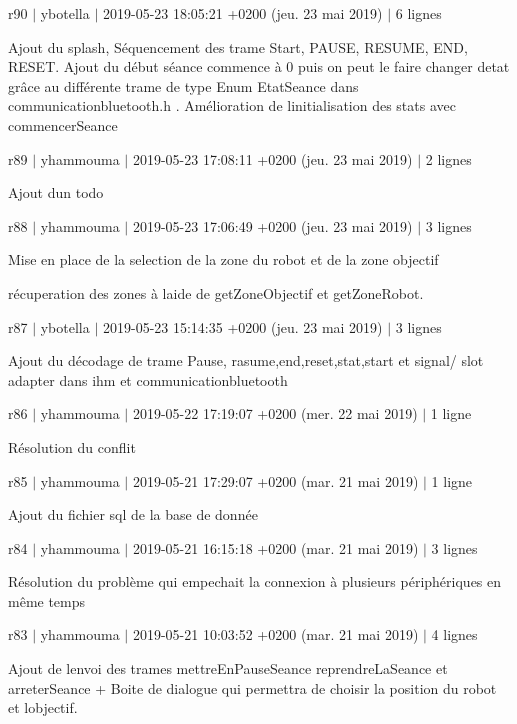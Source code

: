 r90 $\vert$ ybotella $\vert$ 2019-\/05-\/23 18\+:05\+:21 +0200 (jeu. 23 mai 2019) $\vert$ 6 lignes

Ajout du splash, Séquencement des trame Start, P\+A\+U\+SE, R\+E\+S\+U\+ME, E\+ND, R\+E\+S\+ET. Ajout du début séance commence à 0 puis on peut le faire changer d\textquotesingle{}etat grâce au différente trame de type Enum Etat\+Seance dans communicationbluetooth.\+h . Amélioration de l\textquotesingle{}initialisation des stats avec commencer\+Seance

r89 $\vert$ yhammouma $\vert$ 2019-\/05-\/23 17\+:08\+:11 +0200 (jeu. 23 mai 2019) $\vert$ 2 lignes

Ajout d\textquotesingle{}un todo

r88 $\vert$ yhammouma $\vert$ 2019-\/05-\/23 17\+:06\+:49 +0200 (jeu. 23 mai 2019) $\vert$ 3 lignes

Mise en place de la selection de la zone du robot et de la zone objectif
\begin{DoxyItemize}
\item récuperation des zones à l\textquotesingle{}aide de get\+Zone\+Objectif et get\+Zone\+Robot.
\end{DoxyItemize}

r87 $\vert$ ybotella $\vert$ 2019-\/05-\/23 15\+:14\+:35 +0200 (jeu. 23 mai 2019) $\vert$ 3 lignes

Ajout du décodage de trame Pause, rasume,end,reset,stat,start et signal/ slot adapter dans ihm et communicationbluetooth

r86 $\vert$ yhammouma $\vert$ 2019-\/05-\/22 17\+:19\+:07 +0200 (mer. 22 mai 2019) $\vert$ 1 ligne

Résolution du conflit

r85 $\vert$ yhammouma $\vert$ 2019-\/05-\/21 17\+:29\+:07 +0200 (mar. 21 mai 2019) $\vert$ 1 ligne

Ajout du fichier sql de la base de donnée

r84 $\vert$ yhammouma $\vert$ 2019-\/05-\/21 16\+:15\+:18 +0200 (mar. 21 mai 2019) $\vert$ 3 lignes

Résolution du problème qui empechait la connexion à plusieurs périphériques en même temps

r83 $\vert$ yhammouma $\vert$ 2019-\/05-\/21 10\+:03\+:52 +0200 (mar. 21 mai 2019) $\vert$ 4 lignes

Ajout de l\textquotesingle{}envoi des trames mettre\+En\+Pause\+Seance reprendre\+La\+Seance et arreter\+Seance + Boite de dialogue qui permettra de choisir la position du robot et l\textquotesingle{}objectif.

